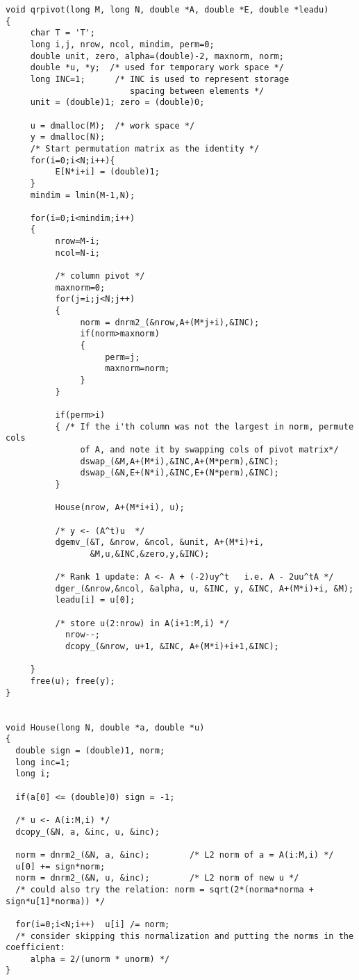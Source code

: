 \documentclass{article}
\begin{document}
\begin{verbatim}
void qrpivot(long M, long N, double *A, double *E, double *leadu)
{
     char T = 'T';  
     long i,j, nrow, ncol, mindim, perm=0;
     double unit, zero, alpha=(double)-2, maxnorm, norm;
     double *u, *y;  /* used for temporary work space */
     long INC=1;      /* INC is used to represent storage 
                         spacing between elements */
     unit = (double)1; zero = (double)0;

     u = dmalloc(M);  /* work space */
     y = dmalloc(N);
     /* Start permutation matrix as the identity */
     for(i=0;i<N;i++){
          E[N*i+i] = (double)1;
     }
     mindim = lmin(M-1,N);

     for(i=0;i<mindim;i++)
     {
          nrow=M-i;
          ncol=N-i;

          /* column pivot */
          maxnorm=0;
          for(j=i;j<N;j++)
          {
               norm = dnrm2_(&nrow,A+(M*j+i),&INC);
               if(norm>maxnorm)
               {
                    perm=j;
                    maxnorm=norm;
               }
          }
          
          if(perm>i)
          { /* If the i'th column was not the largest in norm, permute cols
               of A, and note it by swapping cols of pivot matrix*/
               dswap_(&M,A+(M*i),&INC,A+(M*perm),&INC);
               dswap_(&N,E+(N*i),&INC,E+(N*perm),&INC); 
          }

          House(nrow, A+(M*i+i), u);

          /* y <- (A^t)u  */ 
          dgemv_(&T, &nrow, &ncol, &unit, A+(M*i)+i, 
                 &M,u,&INC,&zero,y,&INC); 
        
          /* Rank 1 update: A <- A + (-2)uy^t   i.e. A - 2uu^tA */
          dger_(&nrow,&ncol, &alpha, u, &INC, y, &INC, A+(M*i)+i, &M);
          leadu[i] = u[0];

          /* store u(2:nrow) in A(i+1:M,i) */
            nrow--; 
            dcopy_(&nrow, u+1, &INC, A+(M*i)+i+1,&INC);

     }
     free(u); free(y);
}


void House(long N, double *a, double *u)
{
  double sign = (double)1, norm;
  long inc=1;
  long i;
    
  if(a[0] <= (double)0) sign = -1;

  /* u <- A(i:M,i) */
  dcopy_(&N, a, &inc, u, &inc);

  norm = dnrm2_(&N, a, &inc);        /* L2 norm of a = A(i:M,i) */
  u[0] += sign*norm;      
  norm = dnrm2_(&N, u, &inc);        /* L2 norm of new u */
  /* could also try the relation: norm = sqrt(2*(norma*norma + sign*u[1]*norma)) */

  for(i=0;i<N;i++)  u[i] /= norm;
  /* consider skipping this normalization and putting the norms in the coefficient:
     alpha = 2/(unorm * unorm) */
}
\end{verbatim}
\end{document}
